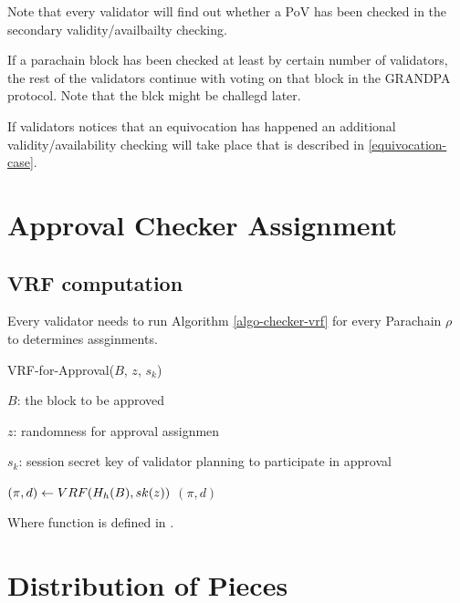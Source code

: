 Note that every validator will find out whether a PoV has been checked in the secondary validity/availbailty checking. 
	 
If a parachain block has been checked at least by certain number of validators, the rest of the validators continue with voting on that block in the GRANDPA protocol. Note that the blck might be challegd later. 
	 
If validators notices that an equivocation has happened an additional validity/availability checking will take place that is described in \ref{equivocation-case}. 
  
\section{Approval Checker Assignment}
\subsection{VRF computation}

Every validator needs to run Algorithm \ref{algo-checker-vrf} for every Parachain $\rho$ to determines assginments.

\begin{algorithm}
  \caption[VRF-for-Approval]{\sc VRF-for-Approval($B$, $z$, $s_k$)}
  \label{algo-checker-vrf}
  \begin{algorithmic}[1]
  \Require

    $B$: the block to be approved 

    $z$: randomness for approval assignmen

    $s_k$: session secret key of validator planning to participate in approval

    \State $(\pi, d) \leftarrow \sc{VRF}(H_h(B),sk(z))$
    \State \Return $(\pi,d)$
  \end{algorithmic}
\end{algorithm}

\begin{algorithm}
  \Require{}
  \caption[]{\sc }
  \begin{algorithmic}[1]
    \State
  \end{algorithmic}
\end{algorithm}

Where  function is defined in \cite{polkadot-crypto-spec}.

\section{Distribution of Pieces}\label{distribute-piece}

